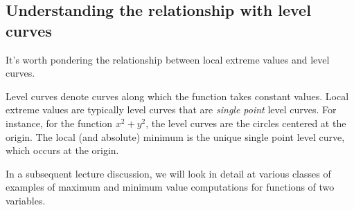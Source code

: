 \documentclass[10pt]{amsart}
\begin{document}
\subsection{Understanding the relationship with level curves}

It's worth pondering the relationship between local extreme values and level curves.

Level curves denote curves along which the function takes constant
values. Local extreme values are typically level curves that are {\em
single point} level curves. For instance, for the function $x^2 +
y^2$, the level curves are the circles centered at the origin. The
local (and absolute) minimum is the unique single point level curve,
which occurs at the origin.

In a subsequent lecture discussion, we will look in detail at various
classes of examples of maximum and minimum value computations for
functions of two variables.
\end{document}
